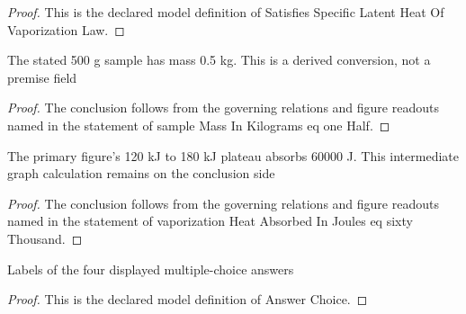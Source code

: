 \begin{proof}
  This is the declared model definition of Satisfies Specific Latent Heat Of Vaporization Law.
\end{proof}
\begin{lemma}
  \label{lem:physics:phyx-mini-0405:phyxminiproblems-problemphyxmini0405-samplemassinkilograms-eq-onehalf}
  The stated 500 g sample has mass 0.5 kg. This is a derived conversion, not a premise field
\end{lemma}
\begin{proof}
  The conclusion follows from the governing relations and figure readouts named in the statement of sample Mass In Kilograms eq one Half.
\end{proof}
\begin{lemma}
  \label{lem:physics:phyx-mini-0405:phyxminiproblems-problemphyxmini0405-vaporizationheatabsorbedinjoules-eq-sixtythousand}
  The primary figure's 120 kJ to 180 kJ plateau absorbs 60000 J. This intermediate graph calculation remains on the conclusion side
\end{lemma}
\begin{proof}
  The conclusion follows from the governing relations and figure readouts named in the statement of vaporization Heat Absorbed In Joules eq sixty Thousand.
\end{proof}
\begin{definition}
  \label{def:physics:phyx-mini-0405:phyxminiproblems-problemphyxmini0405-answerchoice}
  Labels of the four displayed multiple-choice answers
\end{definition}
\begin{proof}
  This is the declared model definition of Answer Choice.
\end{proof}
